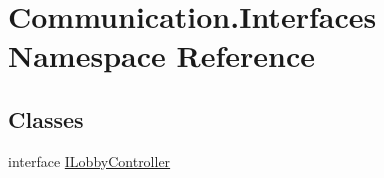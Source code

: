 \hypertarget{namespace_communication_1_1_interfaces}{}\section{Communication.\+Interfaces Namespace Reference}
\label{namespace_communication_1_1_interfaces}
\subsection*{Classes}
\begin{DoxyCompactItemize}
\item 
interface \mbox{\hyperlink{interface_communication_1_1_interfaces_1_1_i_lobby_controller}{I\+Lobby\+Controller}}
\end{DoxyCompactItemize}
